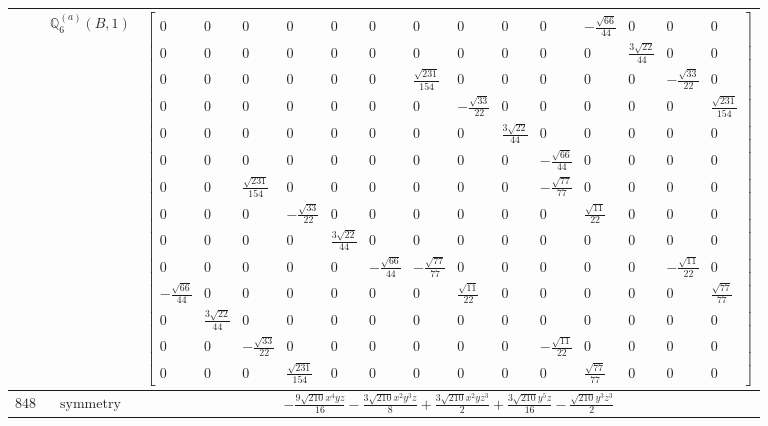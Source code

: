 \documentclass[fleqn,8pt,landscape]{jsarticle}
\begin{document}
\begin{longtable}{ccc}
$  $ & $ \mathbb{Q}_{6}^{(a)}(B,1) $ & $ \begin{bmatrix} 0 & 0 & 0 & 0 & 0 & 0 & 0 & 0 & 0 & 0 & - \frac{\sqrt{66}}{44} & 0 & 0 & 0 \\ 0 & 0 & 0 & 0 & 0 & 0 & 0 & 0 & 0 & 0 & 0 & \frac{3 \sqrt{22}}{44} & 0 & 0 \\ 0 & 0 & 0 & 0 & 0 & 0 & \frac{\sqrt{231}}{154} & 0 & 0 & 0 & 0 & 0 & - \frac{\sqrt{33}}{22} & 0 \\ 0 & 0 & 0 & 0 & 0 & 0 & 0 & - \frac{\sqrt{33}}{22} & 0 & 0 & 0 & 0 & 0 & \frac{\sqrt{231}}{154} \\ 0 & 0 & 0 & 0 & 0 & 0 & 0 & 0 & \frac{3 \sqrt{22}}{44} & 0 & 0 & 0 & 0 & 0 \\ 0 & 0 & 0 & 0 & 0 & 0 & 0 & 0 & 0 & - \frac{\sqrt{66}}{44} & 0 & 0 & 0 & 0 \\ 0 & 0 & \frac{\sqrt{231}}{154} & 0 & 0 & 0 & 0 & 0 & 0 & - \frac{\sqrt{77}}{77} & 0 & 0 & 0 & 0 \\ 0 & 0 & 0 & - \frac{\sqrt{33}}{22} & 0 & 0 & 0 & 0 & 0 & 0 & \frac{\sqrt{11}}{22} & 0 & 0 & 0 \\ 0 & 0 & 0 & 0 & \frac{3 \sqrt{22}}{44} & 0 & 0 & 0 & 0 & 0 & 0 & 0 & 0 & 0 \\ 0 & 0 & 0 & 0 & 0 & - \frac{\sqrt{66}}{44} & - \frac{\sqrt{77}}{77} & 0 & 0 & 0 & 0 & 0 & - \frac{\sqrt{11}}{22} & 0 \\ - \frac{\sqrt{66}}{44} & 0 & 0 & 0 & 0 & 0 & 0 & \frac{\sqrt{11}}{22} & 0 & 0 & 0 & 0 & 0 & \frac{\sqrt{77}}{77} \\ 0 & \frac{3 \sqrt{22}}{44} & 0 & 0 & 0 & 0 & 0 & 0 & 0 & 0 & 0 & 0 & 0 & 0 \\ 0 & 0 & - \frac{\sqrt{33}}{22} & 0 & 0 & 0 & 0 & 0 & 0 & - \frac{\sqrt{11}}{22} & 0 & 0 & 0 & 0 \\ 0 & 0 & 0 & \frac{\sqrt{231}}{154} & 0 & 0 & 0 & 0 & 0 & 0 & \frac{\sqrt{77}}{77} & 0 & 0 & 0 \end{bmatrix} $ \\ \hline
$ 848 $ & $ \text{symmetry} $ & $ - \frac{9 \sqrt{210} x^{4} y z}{16} - \frac{3 \sqrt{210} x^{2} y^{3} z}{8} + \frac{3 \sqrt{210} x^{2} y z^{3}}{2} + \frac{3 \sqrt{210} y^{5} z}{16} - \frac{\sqrt{210} y^{3} z^{3}}{2} $ \\

\end{longtable}
\end{document}
